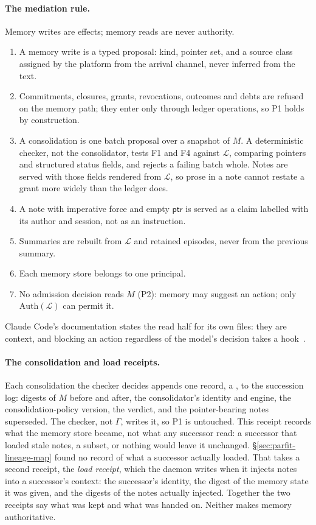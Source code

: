 \paragraph{The mediation rule.}
Memory writes are effects; memory reads are never authority.
\begin{enumerate}[leftmargin=1.6em,itemsep=1pt]
\item A memory write is a typed proposal: kind, pointer set, and a source class
assigned by the platform from the arrival channel, never inferred from the text.
\item Commitments, closures, grants, revocations, outcomes and debts are refused
on the memory path; they enter only through ledger operations, so P1 holds by
construction.
\item A consolidation is one batch proposal over a snapshot of $M$. A
deterministic checker, not the consolidator, tests F1 and F4 against $\mathcal{L}$,
comparing pointers and structured status fields, and rejects a failing batch
whole. Notes are served with those fields rendered from $\mathcal{L}$, so prose in a note
cannot restate a grant more widely than the ledger does.
\item A note with imperative force and empty $\mathsf{ptr}$ is served as a claim
labelled with its author and session, not as an instruction.
\item Summaries are rebuilt from $\mathcal{L}$ and retained episodes, never from the
previous summary.
\item Each memory store belongs to one principal.
\item No admission decision reads $M$ (P2): memory may suggest an action; only
$\mathrm{Auth}(\mathcal{L})$ can permit it.
\end{enumerate}
Claude Code's documentation states the read half for its own files: they are context,
and blocking an action regardless of the model's decision takes a
hook~.

\paragraph{The consolidation and load receipts.}\pdstatus{\Vision}{}
Each consolidation the checker decides appends one record, a
, to the succession log: digests of $M$ before and
after, the consolidator's identity and engine, the consolidation-policy
version, the verdict, and the pointer-bearing notes superseded. The checker,
not $\Gamma$, writes it, so P1 is untouched. This receipt records what the
memory store became, not what any successor read: a successor that loaded
stale notes, a subset, or nothing would leave it unchanged.
\S\ref{sec:parfit-lineage-map} found no record of what a successor actually
loaded. That takes a second receipt, the \emph{load receipt}, which the daemon
writes when it injects notes into a successor's context: the successor's identity, the digest of the memory state it was
given, and the digests of the notes actually injected. Together the two
receipts say what was kept and what was handed on. Neither makes memory
authoritative.

